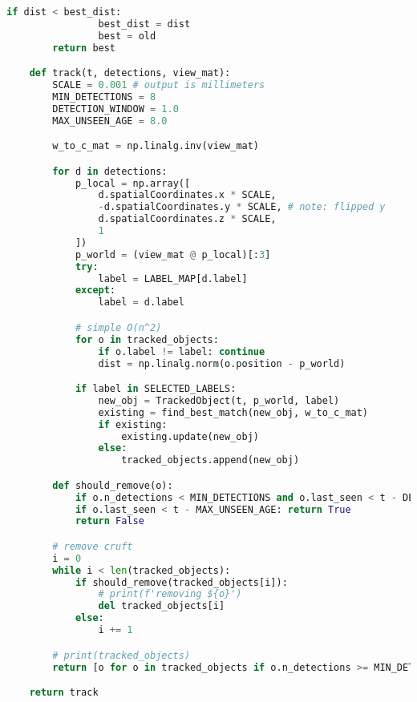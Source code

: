 \begin{lstlisting}[language=python,frame=single]
            if dist < best_dist:
                best_dist = dist
                best = old
        return best

    def track(t, detections, view_mat):
        SCALE = 0.001 # output is millimeters
        MIN_DETECTIONS = 8
        DETECTION_WINDOW = 1.0
        MAX_UNSEEN_AGE = 8.0

        w_to_c_mat = np.linalg.inv(view_mat)

        for d in detections:
            p_local = np.array([
                d.spatialCoordinates.x * SCALE,
                -d.spatialCoordinates.y * SCALE, # note: flipped y
                d.spatialCoordinates.z * SCALE,
                1
            ])
            p_world = (view_mat @ p_local)[:3]
            try:
                label = LABEL_MAP[d.label]
            except:
                label = d.label

            # simple O(n^2)
            for o in tracked_objects:
                if o.label != label: continue
                dist = np.linalg.norm(o.position - p_world)

            if label in SELECTED_LABELS:
                new_obj = TrackedObject(t, p_world, label)
                existing = find_best_match(new_obj, w_to_c_mat)
                if existing:
                    existing.update(new_obj)
                else:
                    tracked_objects.append(new_obj)

        def should_remove(o):
            if o.n_detections < MIN_DETECTIONS and o.last_seen < t - DETECTION_WINDOW: return True
            if o.last_seen < t - MAX_UNSEEN_AGE: return True
            return False

        # remove cruft
        i = 0
        while i < len(tracked_objects):
            if should_remove(tracked_objects[i]):
                # print(f'removing ${o}')
                del tracked_objects[i]
            else:
                i += 1

        # print(tracked_objects)
        return [o for o in tracked_objects if o.n_detections >= MIN_DETECTIONS]

    return track


\end{lstlisting}
